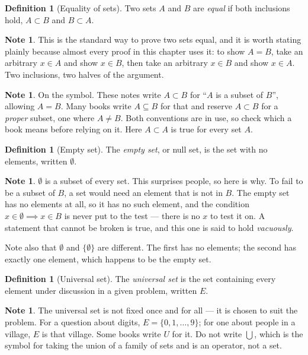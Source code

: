 \documentclass[11pt,a4paper]{article}
\theoremstyle{definition}
\newtheorem{definition}[thm]{Definition}
\newtheorem{note}[thm]{Note}
\begin{document}
\begin{definition}[Equality of sets]
Two sets $A$ and $B$ are \emph{equal} if both inclusions hold, $A\subset B$ and
$B\subset A$.
\end{definition}

\begin{note}
This is the standard way to prove two sets equal, and it is worth stating plainly
because almost every proof in this chapter uses it: to show $A=B$, take an
arbitrary $x\in A$ and show $x\in B$, then take an arbitrary $x\in B$ and show
$x\in A$. Two inclusions, two halves of the argument.
\end{note}

\begin{note}
On the symbol. These notes write $A\subset B$ for ``$A$ is a subset of $B$'',
allowing $A=B$. Many books write $A\subseteq B$ for that and reserve $A\subset B$
for a \emph{proper} subset, one where $A\neq B$. Both conventions are in use, so
check which a book means before relying on it. Here $A\subset A$ is true for every
set $A$.
\end{note}

\begin{definition}[Empty set]
The \emph{empty set}, or null set, is the set with no elements, written
$\emptyset$.
\end{definition}

\begin{note}
$\emptyset$ is a subset of every set. This surprises people, so here is why. To
fail to be a subset of $B$, a set would need an element that is not in $B$. The
empty set has no elements at all, so it has no such element, and the condition
$x\in\emptyset\implies x\in B$ is never put to the test --- there is no $x$ to test
it on. A statement that cannot be broken is true, and this one is said to hold
\emph{vacuously}.

Note also that $\emptyset$ and $\{\emptyset\}$ are different. The first has no
elements; the second has exactly one element, which happens to be the empty set.
\end{note}

\begin{definition}[Universal set]
The \emph{universal set} is the set containing every element under discussion in a
given problem, written $E$.
\end{definition}

\begin{note}
The universal set is not fixed once and for all --- it is chosen to suit the
problem. For a question about digits, $E=\{0,1,\dots,9\}$; for one about people in
a village, $E$ is that village. Some books write $U$ for it. Do not write
$\bigcup$, which is the symbol for taking the union of a family of sets and is an
operator, not a set.
\end{note}
\end{document}
